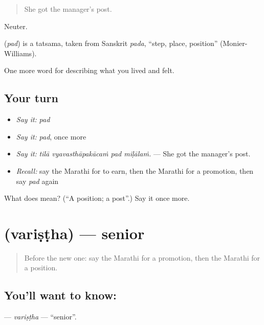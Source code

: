 \begin{quote}
She got the manager's post.
\end{quote}

Neuter.

\begin{cousinweb}
\textbf{} (\emph{pad}) is a tatsama, taken from Sanskrit \emph{pada}, \textquotedblleft{}step, place, position\textquotedblright{} (Monier-Williams).
\end{cousinweb}

\begin{grammarlens}[title={What you've built}]
One more word for describing what you lived and felt.
\end{grammarlens}

\subsection*{Your turn}
\begin{itemize}
\raggedright
  \item \emph{Say it:} \emph{pad}
  \item \emph{Say it:} \emph{pad}, once more
  \item \emph{Say it:} \emph{tilā vyavasthāpakācaṁ pad miḷālaṁ.} — She got the manager's post.
  \item \emph{Recall:} say the Marathi for to earn, then the Marathi for a promotion, then say \emph{pad} again
\end{itemize}

\begin{tcolorbox}[breakable,colback=teal!4,colframe=teal!35!black,title={Before you move on}]
What does  mean? (\textquotedblleft{}A position; a post\textquotedblright{}.) Say it once more.
\end{tcolorbox}
\section[\texorpdfstring{\mr{वरिष्ठ} (variṣṭha)}{वरिष्ठ (variṣṭha)}]{ (variṣṭha) — senior}

\label{lesson:MR-C509-varistha}



\begin{quote}
Before the new one: say the Marathi for a promotion, then the Marathi for a position.
\end{quote}

\subsection*{You'll want to know: }
\textbf{} — \emph{variṣṭha} — \textquotedblleft{}senior\textquotedblright{}.

